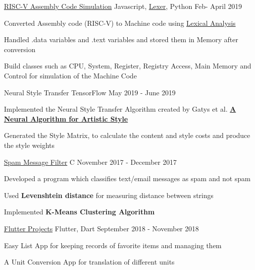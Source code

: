 \begin{cventries}
    \projects
    {} %
    {\href{https://github.com/vinx-2105/assembly-simulator}{RISC-V Assembly Code Simulation}} %
    {Javascript, \href{https://github.com/aaditmshah/lexer}{Lexer}, Python} %
    {Feb- April 2019} %
    {
      \begin{cvitems} %
        \item {Converted Assembly code (RISC-V) to Machine code using \href{https://github.com/aaditmshah/lexer}{Lexical Analysis}}
        \item {Handled .data variables and .text variables and stored them in Memory after conversion}
        \item {Build classes such as CPU, System, Register, Registry Access, Main Memory and Control for simulation of the Machine Code}
      \end{cvitems}
      }
      
      \projects
    {} %
    {{Neural Style Transfer}} %
    {TensorFlow} %
    {May 2019 - June 2019} %
    {
      \begin{cvitems} %
        \item {Implemented the Neural Style Transfer Algorithm created by Gatys et al. \href{https://arxiv.org/abs/1508.06576}{\textbf{A Neural Algorithm for Artistic Style}}}
        \item {Generated the Style Matrix, to calculate the content and style costs and produce the style weights}
      \end{cvitems}
    }
      
      \projects
      {} %
      {\href{https://github.com/parthgoyal123/Queen-McCluskey}{Spam Message Filter}} %
      {C} %
      {November 2017 - December 2017} %
      {
        \begin{cvitems} %
          \item {Developed a program which classifies text/email messages as spam and not spam}
          \item {Used \textbf{Levenshtein distance} for measuring distance between strings} 
          \item {Implemented \textbf{K-Means Clustering Algorithm}}
        \end{cvitems}
        }


  \projects
    {} %
    {\href{https://github.com/parthgoyal123/Flutter-Projects}{Flutter Projects}} %
    {Flutter, Dart} %
    {September 2018 - November 2018} %
    {
      \begin{cvitems} %
        \item {Easy List App for keeping records of favorite items and managing them}
        \item {A Unit Conversion App for translation of different units}
      \end{cvitems}
    }


\end{cventries}
